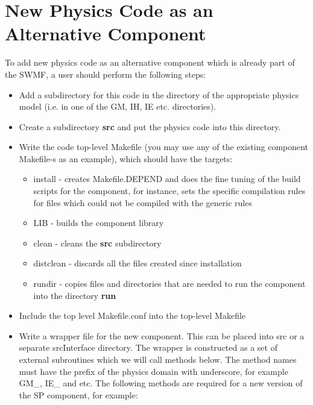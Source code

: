 \section{New Physics Code as an Alternative Component}

To add new physics code as an alternative component which is already part of 
the SWMF, a user should perform the following steps:

\begin{itemize}
\item Add a subdirectory for this code in the directory of the 
appropriate physics model (i.e. in one of the GM, IH, IE etc.
directories).

\item Create a subdirectory \textbf{src} and put the physics code into 
      this directory.
 
\item Write the code top-level Makefile (you may use any of the
      existing component Makefile-s as an example),
      which should have the targets:

\begin{itemize}
\item install - creates Makefile.DEPEND and does the fine 
                tuning of the build scripts 
                for the component, for instance, sets the specific 
                compilation rules for files which 
                could not be compiled with the generic rules 
\item LIB - builds the component library
\item clean - cleans the \textbf{src} subdirectory
\item distclean - discards all the files created since installation
\item rundir - copies files and directories that are needed to run the 
               component into the directory \textbf{run}
\end{itemize}

\item Include the top level Makefile.conf into the top-level Makefile

\item Write a wrapper file for the new component. 
      This can be placed into src or a separate srcInterface directory.
      The wrapper is constructed as 
      a set of external subroutines which we will call methods below. 
      The method names must have the prefix 
      of the physics domain with underscore, for example GM\_, IE\_ and etc. 
      The following methods are required for a new version of the
      SP component, for example:


\end{itemize}
